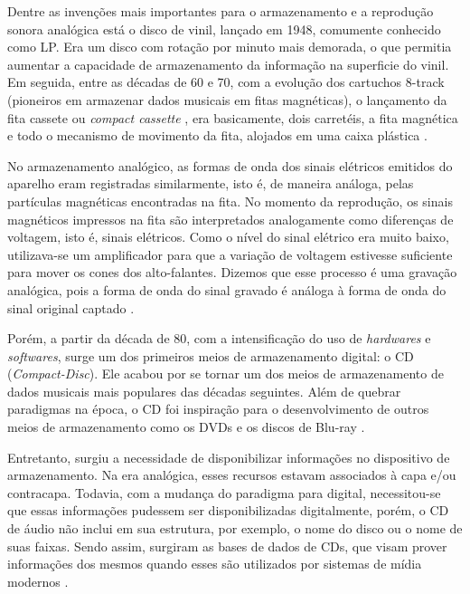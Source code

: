 Dentre as invenções mais importantes para o armazenamento e a reprodução sonora analógica está o disco de vinil, lançado em 1948, comumente conhecido como LP. Era um disco com rotação por minuto mais demorada, o que permitia aumentar a capacidade de armazenamento da informação na superficie do vinil. Em seguida, entre as décadas de 60 e 70, com a evolução dos cartuchos 8-track (pioneiros em armazenar dados musicais em fitas magnéticas), o lançamento da fita cassete ou \textit{compact cassette} \cite{marchi2005}, era basicamente, dois carretéis, a fita magnética e todo o mecanismo de movimento da fita, alojados em uma caixa plástica \cite{andrade&crispim2008}.

No armazenamento analógico, as formas de onda dos sinais elétricos emitidos do aparelho eram registradas similarmente, isto é, de maneira análoga, pelas partículas magnéticas encontradas na fita. No momento da reprodução, os sinais magnéticos impressos na fita são interpretados analogamente como diferenças de voltagem, isto é, sinais elétricos. Como o nível do sinal elétrico era muito baixo, utilizava-se um amplificador para que a variação de voltagem estivesse suficiente para mover os cones dos alto-falantes. Dizemos que esse processo é uma gravação analógica, pois a forma de onda do sinal gravado é análoga à forma de onda do sinal original captado \cite{paulozuben2004}.

Porém, a partir da década de 80, com a intensificação do uso de \textit{hardwares} e \textit{softwares}, surge um dos primeiros meios de armazenamento digital: o CD (\textit{Compact-Disc}). Ele acabou por se tornar um dos meios de armazenamento de dados musicais mais populares das décadas seguintes. Além de quebrar paradigmas na época, o CD foi inspiração para o desenvolvimento de outros meios de armazenamento como os DVDs e os discos de Blu-ray \cite{marchi2005}.

Entretanto, surgiu a necessidade de disponibilizar informações no dispositivo de armazenamento. Na era analógica, esses recursos estavam associados à capa e/ou contracapa. Todavia, com a mudança do paradigma para digital, necessitou-se que essas informações pudessem ser disponibilizadas digitalmente, porém, o CD de áudio não inclui em sua estrutura, por exemplo, o nome do disco ou o nome de suas faixas. Sendo assim, surgiram as bases de dados de CDs, que visam prover informações dos mesmos quando esses são utilizados por sistemas de mídia modernos \cite{andrade&crispim2008}.

